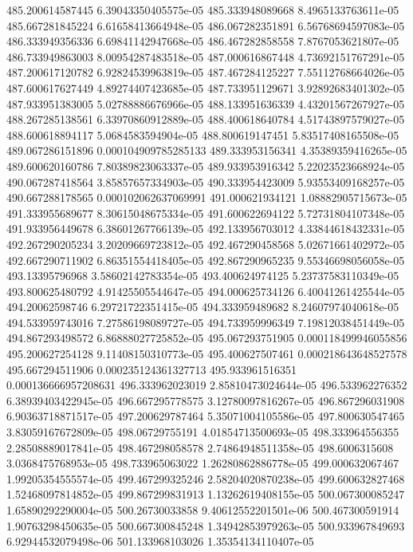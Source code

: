 {485.200614587445 6.39043350405575e-05
485.333948089668 8.4965133763611e-05
485.667281845224 6.61658413664948e-05
486.067282351891 6.56768694597083e-05
486.333949356336 6.69841142947668e-05
486.467282858558 7.8767053621807e-05
486.733949863003 8.00954287483518e-05
487.000616867448 4.73692151767291e-05
487.200617120782 6.92824539963819e-05
487.467284125227 7.55112768664026e-05
487.600617627449 4.89274407423685e-05
487.733951129671 3.92892683401302e-05
487.933951383005 5.02788886676966e-05
488.133951636339 4.43201567267927e-05
488.267285138561 6.33970860912889e-05
488.400618640784 4.51743897579027e-05
488.600618894117 5.0684583594904e-05
488.800619147451 5.83517408165508e-05
489.067286151896 0.000104909785285133
489.333953156341 4.35389359416265e-05
489.600620160786 7.80389823063337e-05
489.933953916342 5.22023523668924e-05
490.067287418564 3.85857657334903e-05
490.333954423009 5.93553409168257e-05
490.667288178565 0.000102062637069991
491.000621934121 1.08882905715673e-05
491.333955689677 8.30615048675334e-05
491.600622694122 5.72731804107348e-05
491.933956449678 6.38601267766139e-05
492.133956703012 4.33844618432331e-05
492.267290205234 3.20209669723812e-05
492.467290458568 5.02671661402972e-05
492.667290711902 6.86351554418405e-05
492.867290965235 9.55346698056058e-05
493.13395796968 3.58602142783354e-05
493.400624974125 5.23737583110349e-05
493.800625480792 4.91425505544647e-05
494.000625734126 6.40041261425544e-05
494.20062598746 6.29721722351415e-05
494.333959489682 8.24607974040618e-05
494.533959743016 7.27586198089727e-05
494.733959996349 7.19812038451449e-05
494.867293498572 6.86888027725852e-05
495.067293751905 0.000118499946055856
495.200627254128 9.11408150310773e-05
495.400627507461 0.000218643648527578
495.667294511906 0.000235124361327713
495.933961516351 0.000136666957208631
496.333962023019 2.85810473024644e-05
496.533962276352 6.38939403422945e-05
496.667295778575 3.12780097816267e-05
496.867296031908 6.90363718871517e-05
497.200629787464 5.35071004105586e-05
497.800630547465 3.83059167672809e-05
498.06729755191 4.01854713500693e-05
498.333964556355 2.28508889017841e-05
498.467298058578 2.74864948511358e-05
498.6006315608 3.0368475768953e-05
498.733965063022 1.26280862886778e-05
499.000632067467 1.99205354555574e-05
499.467299325246 2.58204020870238e-05
499.600632827468 1.52468097814852e-05
499.867299831913 1.13262619408155e-05
500.067300085247 1.65890292290004e-05
500.26730033858 9.40612552201501e-06
500.467300591914 1.90763298450635e-05
500.667300845248 1.34942853979263e-05
500.933967849693 6.92944532079498e-06
501.133968103026 1.35354134110407e-05
}
